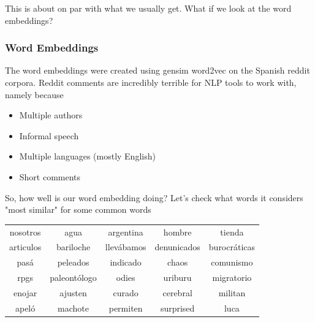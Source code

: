 \documentclass[11pt]{article} %
\begin{document}
This is about on par with what we usually get. What if we look at the word embeddings?

\subsubsection{Word Embeddings}

The word embeddings were created using gensim word2vec on the Spanish reddit corpora. Reddit comments are incredibly terrible for NLP tools to work with, namely because
\begin{itemize}
\item Multiple authors \\
\item Informal speech \\
\item Multiple languages (mostly English) \\
\item Short comments\end{itemize}

So, how well is our word embedding doing? Let's check what words it considers "most similar" for some common words

\begin{tabular}{c|c|c|c|c}
\rowcolor{gray!50} nosotros & agua & argentina & hombre & tienda \\
articulos & bariloche & llev\'abamos & denunicados & burocr\'aticas \\ 
pas\'a & peleados & indicado & chaos & comunismo \\
rpgs & paleont\'ologo & odies & uriburu & migratorio \\
enojar & ajusten & curado & cerebral & militan \\
apel\'o & machote & permiten & surprised & luca \end{tabular}
\end{document}
